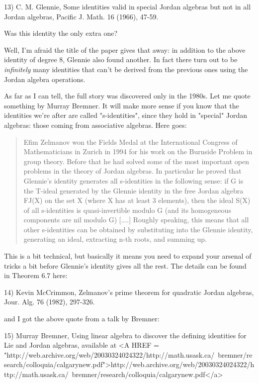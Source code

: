 13) C. M. Glennie, Some identities valid in special Jordan
algebras but not in all Jordan algebras, Pacific J. Math. 16
(1966), 47-59.

Was this identity the only extra one?

Well, I'm afraid the title of the paper gives that away: in addition to
the above identity of degree 8, Glennie also found another.  In fact
there turn out to be \emph{infinitely} many identities that can't be derived
from the previous ones using the Jordan algebra operations.

As far as I can tell, the full story was discovered only in the 1980s.
Let me quote something by Murray Bremner.  It will make more sense if
you know that the identities we're after are called "s-identities",
since they hold in "special" Jordan algebras: those coming from
associative algebras.  Here goes:

\begin{quote}
   Efim Zelmanov won the Fields Medal at the International Congress of
   Mathematicians in Zurich in 1994 for his work on the Burnside Problem
   in group theory. Before that he had solved some of the most important
   open problems in the theory of Jordan algebras.  In particular he
   proved that Glennie's identity generates all s-identities in the
   following sense: if G is the T-ideal generated by the Glennie
   identity in the free Jordan algebra FJ(X) on the set X (where X has
   at least 3 elements), then the ideal S(X) of all s-identities is
   quasi-invertible modulo G (and its homogeneous components are nil
   modulo G) [....] Roughly speaking, this means that all other
   s-identities can be obtained by substituting into the Glennie
   identity, generating an ideal, extracting n-th roots, and summing up.

\end{quote}
This is a bit technical, but basically it means you need to expand your
arsenal of tricks a bit before Glennie's identity gives all the rest.
The details can be found in Theorem 6.7 here:

14) Kevin McCrimmon, Zelmanov's prime theorem for quadratic Jordan 
algebras, Jour. Alg. 76 (1982), 297-326. 

and I got the above quote from a talk by Bremner:

15) Murray Bremner, Using linear algebra to discover the defining
identities for Lie and Jordan algebras, available at 
<A HREF = "http://web.archive.org/web/20030324024322/http://math.usask.ca/~bremner/research/colloquia/calgarynew.pdf">http://web.archive.org/web/20030324024322/http://math.usask.ca/~bremner/research/colloquia/calgarynew.pdf</a>


